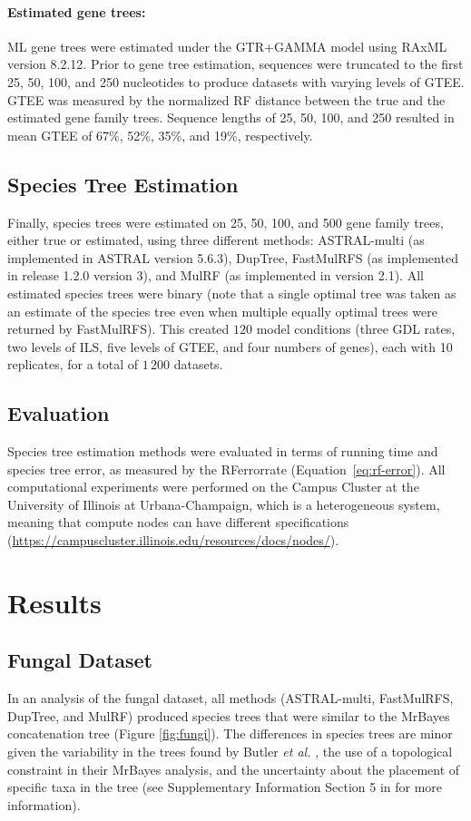 \paragraph{Estimated gene trees:}
ML gene trees were estimated under the GTR+GAMMA model using RAxML version 8.2.12. 
Prior to gene tree estimation, sequences were truncated to the first 25, 50, 100, and 250 nucleotides to produce datasets with varying levels of GTEE.
GTEE was measured by the normalized RF distance between the true and the estimated gene family trees.
Sequence lengths of 25, 50, 100, and 250 resulted in mean GTEE of 67\%, 52\%, 35\%, and 19\%, respectively.

\subsection{Species Tree Estimation}
Finally, species trees were estimated on 25, 50, 100, and 500 gene family trees, either true or estimated, using three different methods: ASTRAL-multi (as implemented in ASTRAL version 5.6.3), DupTree, FastMulRFS (as implemented in release 1.2.0 version 3), and MulRF (as implemented in version 2.1).
All estimated species trees were binary (note that a single optimal tree was taken as an estimate of the species tree even when multiple equally optimal trees were returned by FastMulRFS).
This created $120$ model conditions (three GDL rates, two levels of ILS, five levels of GTEE, and four numbers of genes), each with 10 replicates, for a total of $1\,200$ datasets.

\subsection{Evaluation}
Species tree estimation methods were evaluated in terms of running time and species tree error, as measured by the \gls{RFerrorrate} (Equation~\ref{eq:rf-error}).
All computational experiments were performed on the Campus Cluster at the University of Illinois at Urbana-Champaign, which is a heterogeneous system, meaning that compute nodes can have different specifications (\href{https://campuscluster.illinois.edu/resources/docs/nodes/}{https://campuscluster.illinois.edu/resources/docs/nodes/}).

\section{Results}
\label{sec:fastmulrfs-results}
\subsection{Fungal Dataset}
In an analysis of the fungal dataset, all methods (ASTRAL-multi, FastMulRFS, DupTree, and MulRF) produced species trees that were similar to the MrBayes concatenation tree (Figure \ref{fig:fungi}).
The differences in species trees are minor given the variability in the trees found by Butler {\em et al.} \cite{butler2009evolution}, the use of a topological constraint in their MrBayes analysis, and the uncertainty about the placement of specific taxa in the tree (see Supplementary Information Section 5 in \cite{butler2009evolution} for more information).  

